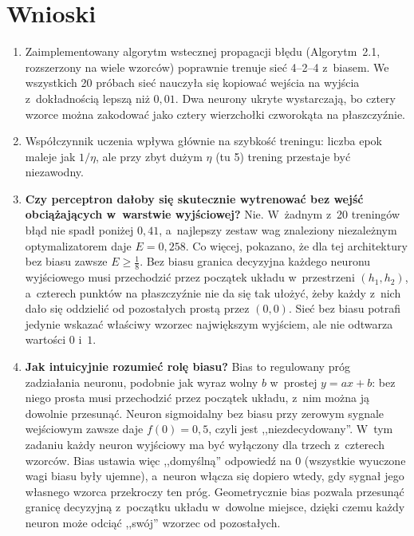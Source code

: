 \documentclass[12pt]{article}
\begin{document}
\section{Wnioski}

\begin{enumerate}
 \item Zaimplementowany algorytm wstecznej propagacji błędu (Algorytm~2.1, rozszerzony na wiele
       wzorców) poprawnie trenuje sieć 4--2--4 z~biasem. We wszystkich 20 próbach sieć nauczyła się
       kopiować wejścia na wyjścia z~dokładnością lepszą niż $0{,}01$. Dwa neurony ukryte wystarczają,
       bo cztery wzorce można zakodować jako cztery wierzchołki czworokąta na płaszczyźnie.
 \item Współczynnik uczenia wpływa głównie na szybkość treningu: liczba epok maleje jak $1/\eta$,
       ale przy zbyt dużym $\eta$ (tu 5) trening przestaje być niezawodny.
 \item \textbf{Czy perceptron dałoby się skutecznie wytrenować bez wejść obciążających w~warstwie
       wyjściowej?} Nie. W~żadnym z~20 treningów błąd nie spadł poniżej $0{,}41$, a~najlepszy zestaw
       wag znaleziony niezależnym optymalizatorem daje $E=0{,}258$. Co więcej, pokazano, że dla tej
       architektury bez biasu zawsze $E\ge\tfrac18$. Bez biasu granica decyzyjna każdego neuronu
       wyjściowego musi przechodzić przez początek układu w~przestrzeni $(h_1,h_2)$, a~czterech punktów
       na płaszczyźnie nie da się tak ułożyć, żeby każdy z~nich dało się oddzielić od pozostałych
       prostą przez $(0,0)$. Sieć bez biasu potrafi jedynie wskazać właściwy wzorzec największym
       wyjściem, ale nie odtwarza wartości $0$ i~$1$.
 \item \textbf{Jak intuicyjnie rozumieć rolę biasu?} Bias to regulowany próg zadziałania neuronu,
       podobnie jak wyraz wolny $b$ w~prostej $y=ax+b$: bez niego prosta musi przechodzić przez
       początek układu, z~nim można ją dowolnie przesunąć. Neuron sigmoidalny bez biasu przy zerowym
       sygnale wejściowym zawsze daje $f(0)=0{,}5$, czyli jest ,,niezdecydowany''. W~tym zadaniu każdy
       neuron wyjściowy ma być wyłączony dla trzech z~czterech wzorców. Bias ustawia więc
       ,,domyślną'' odpowiedź na $0$ (wszystkie wyuczone wagi biasu były ujemne), a~neuron włącza
       się dopiero wtedy, gdy sygnał jego własnego wzorca przekroczy ten próg. Geometrycznie bias
       pozwala przesunąć granicę decyzyjną z~początku układu w~dowolne miejsce, dzięki czemu każdy
       neuron może odciąć ,,swój'' wzorzec od pozostałych.
\end{enumerate}
\end{document}
